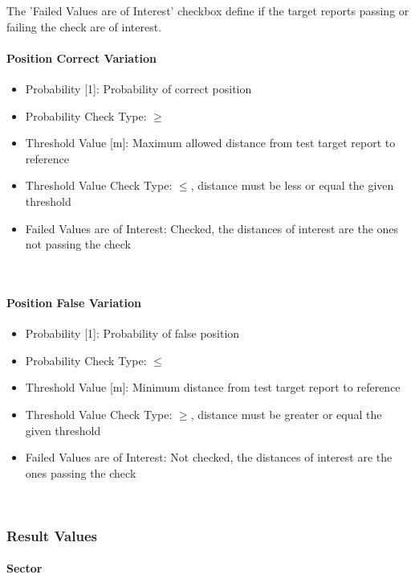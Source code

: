 The 'Failed Values are of Interest' checkbox define if the target reports passing or failing the check are of interest.


\paragraph{Position Correct Variation}

\begin{itemize}  
\item Probability [1]: Probability of correct position
\item Probability Check Type: $\geq$
\item Threshold Value [m]: Maximum allowed distance from test target report to reference
\item Threshold Value Check Type: $\leq$, distance must be less or equal the given threshold
\item Failed Values are of Interest: Checked, the distances of interest are the ones not passing the check
\end{itemize}
\ \\

\paragraph{Position False Variation}

\begin{itemize}  
\item Probability [1]: Probability of false position
\item Probability Check Type: $\leq$
\item Threshold Value [m]: Minimum distance from test target report to reference
\item Threshold Value Check Type: $\geq$, distance must be greater or equal the given threshold
\item Failed Values are of Interest: Not checked, the distances of interest are the ones passing the check
\end{itemize}
\ \\

\subsubsection{Result Values}

\paragraph{Sector}

